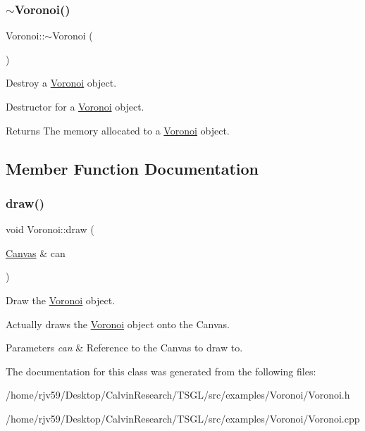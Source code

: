 \subsubsection{\texorpdfstring{$\sim$\+Voronoi()}{~Voronoi()}}
{\footnotesize\ttfamily Voronoi\+::$\sim$\+Voronoi (\begin{DoxyParamCaption}{ }\end{DoxyParamCaption})\hspace{0.3cm}{\ttfamily [virtual]}}



Destroy a \hyperlink{class_voronoi}{Voronoi} object. 

Destructor for a \hyperlink{class_voronoi}{Voronoi} object. \begin{DoxyReturn}{Returns}
The memory allocated to a \hyperlink{class_voronoi}{Voronoi} object. 
\end{DoxyReturn}


\subsection{Member Function Documentation}
\mbox{\label{class_voronoi_a8455f7017a285ff1859829202970f071}} 
\subsubsection{\texorpdfstring{draw()}{draw()}}
{\footnotesize\ttfamily void Voronoi\+::draw (\begin{DoxyParamCaption}\item[{\hyperlink{classtsgl_1_1_canvas}{Canvas} \&}]{can }\end{DoxyParamCaption})}



Draw the \hyperlink{class_voronoi}{Voronoi} object. 

Actually draws the \hyperlink{class_voronoi}{Voronoi} object onto the Canvas. 
\begin{DoxyParams}{Parameters}
{\em can} & Reference to the Canvas to draw to. \\
\hline
\end{DoxyParams}


The documentation for this class was generated from the following files\+:\begin{DoxyCompactItemize}
\item 
/home/rjv59/\+Desktop/\+Calvin\+Research/\+T\+S\+G\+L/src/examples/\+Voronoi/Voronoi.\+h\item 
/home/rjv59/\+Desktop/\+Calvin\+Research/\+T\+S\+G\+L/src/examples/\+Voronoi/Voronoi.\+cpp\end{DoxyCompactItemize}
